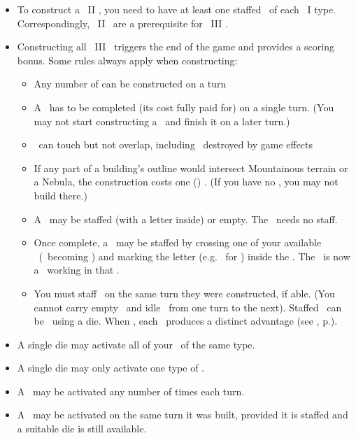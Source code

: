 \begin{itemize}
	\item To construct a \level\ II \fortification, you need to have at least one staffed \fortification\ of each \level\ I type. Correspondingly, \level\ II \fortifications\ are a prerequisite for \level\ III \fortifications.
	\item Constructing all \level\ III \fortifications\ triggers the end of the game and provides a scoring bonus.  Some rules always apply when constructing:
  \begin{itemize}
    \item Any number of \fortifications can be constructed on a turn
    \item A \fortification\ has to be completed (its cost fully paid for) on a single turn. (You may not start constructing a \fortification\ and finish it on a later turn.)
    \item \fortifications\ can touch but not overlap, including \fortifications\ destroyed by game effects
    \item If any part of a building’s outline would intersect Mountainous terrain or a Nebula, the construction costs one (\spendcurrency) \currency. (If you have no \currency, you may not build there.)
    \item A \fortification\ may be staffed (with a letter inside) or empty.  The \spacestation\ needs no staff.
    \item Once complete, a \fortification\ may be staffed by crossing one of your available \astronauts\ (\gainastronautsymbol\ becoming \useastronautsymbol) and marking the letter (e.g. \academysymbol\ for \academy) inside the \fortification. The \astronaut\ is now a \specialist\ working in that \fortification.
    \item You must staff \fortifications\ on the same turn they were constructed, if able. (You cannot carry empty \fortifications\ and idle \astronauts\ from one turn to the next).  Staffed \fortifications\ can be \activated\ using a die.  When \activated, each \fortification\ produces a distinct advantage (see , p.\pageref{sec:fortifications}).
  \end{itemize}
  \item A single die may activate all of your \fortifications\ of the same type.
  \item A single die may only activate one type of \fortification.
  \item A \fortification\ may be activated any number of times each turn.
  \item A \fortification\ may be activated on the same turn it was built, provided it is staffed and a suitable die is still available.
\end{itemize}
